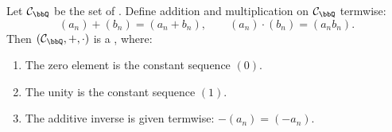 \begin{proposition} \label{proposition:cauchy_sequences_of_rational_numbers_form_commutative_ring}
    Let $\mathcal{C}_\bbQ$ be the set of . Define addition and multiplication on $\mathcal{C}_\bbQ$ termwise:
    $$(a_n) + (b_n) = (a_n + b_n), \qquad (a_n) \cdot (b_n) = (a_n b_n).$$
    Then $(\mathcal{C}_\bbQ, +, \cdot)$ is a , where:
    \begin{enumerate}
        \item The zero element is the constant sequence $(0)$.
        \item The unity is the constant sequence $(1)$.
        \item The additive inverse is given termwise: $-(a_n) = (-a_n)$.
    \end{enumerate}
\end{proposition}

